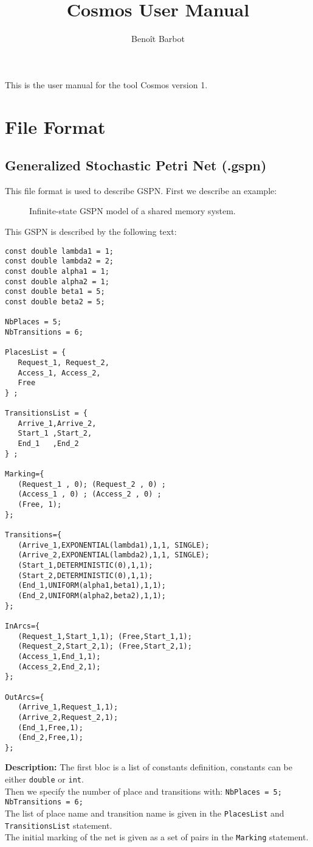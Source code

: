 \documentclass{article}
\title{Cosmos User Manual}
\author{Beno\^it Barbot}
\begin{document}
\maketitle


This is the user manual for the tool Cosmos version 1.

\section{File Format}
\subsection{Generalized Stochastic Petri Net (.gspn)}
This file format is used to describe GSPN.
First we describe an example:
\begin{figure}[h]
  \centering
  
  \caption{Infinite-state GSPN  model of a shared memory system.}
  \label{fig:sharedmem}
\end{figure}
This GSPN is described by the following text:
\begin{verbatim}
const double lambda1 = 1;
const double lambda2 = 2;
const double alpha1 = 1;
const double alpha2 = 1;
const double beta1 = 5;
const double beta2 = 5;

NbPlaces = 5;
NbTransitions = 6;

PlacesList = { 
   Request_1, Request_2,
   Access_1, Access_2,
   Free
} ;

TransitionsList = { 
   Arrive_1,Arrive_2,
   Start_1 ,Start_2,
   End_1   ,End_2
} ;

Marking={
   (Request_1 , 0); (Request_2 , 0) ; 
   (Access_1 , 0) ; (Access_2 , 0) ;
   (Free, 1);
};

Transitions={
   (Arrive_1,EXPONENTIAL(lambda1),1,1, SINGLE); 
   (Arrive_2,EXPONENTIAL(lambda2),1,1, SINGLE);
   (Start_1,DETERMINISTIC(0),1,1); 
   (Start_2,DETERMINISTIC(0),1,1);
   (End_1,UNIFORM(alpha1,beta1),1,1); 
   (End_2,UNIFORM(alpha2,beta2),1,1);
};

InArcs={
   (Request_1,Start_1,1); (Free,Start_1,1);
   (Request_2,Start_2,1); (Free,Start_2,1);
   (Access_1,End_1,1);
   (Access_2,End_2,1);
};

OutArcs={
   (Arrive_1,Request_1,1); 
   (Arrive_2,Request_2,1);
   (End_1,Free,1);
   (End_2,Free,1);
};
\end{verbatim}

{\bf Description:}
The first bloc is a list of constants definition, constants can be
either \verb|double| or \verb|int|.\\
Then we specify the number of place and transitions with:
\verb|NbPlaces = 5; NbTransitions = 6;|\\
The list of place name and transition name is given in the
\verb|PlacesList| and \verb|TransitionsList| statement.\\
The initial marking of the net is given as a set of pairs
in the \verb|Marking| statement.\\
\end{document}
